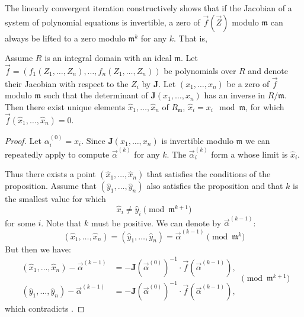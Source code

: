 The linearly convergent iteration constructively shows that if the
Jacobian of a system of polynomial equations is invertible, a zero of
$\vec{f}(\vec{Z})$ modulo $\mathfrak{m}$ can always be lifted to a zero
modulo $\mathfrak{m}^k$ for any $k$.  That is,

\begin{proposition}\label{MNewton:Iter:Prop}
Assume $R$ is an integral domain with an ideal $\mathfrak{m}$.  Let
$\vec{f} = (f_1(Z_1, \ldots, Z_n), \ldots, f_n(Z_1, \ldots, Z_n))$ be
polynomials over $R$ and denote their Jacobian with respect to the
$Z_i$ by $\mathbf{J}$.  Let $(x_1, \ldots, x_n)$ be a zero of $\vec{f}$
modulo $\mathfrak{m}$ such that the determinant of $\mathbf{J}(x_1, \ldots,
x_n)$ has an inverse in $R/\mathfrak{m}$.  Then there exist unique
elements $\hat{x}_1, \ldots, \hat{x}_n$ of $R_\mathfrak{m}$, $\hat{x}_i =
x_i \mod\mathfrak{m}$, for which $\vec{f}(\hat{x}_1, \ldots, \hat{x}_n)
= 0$.
\end{proposition}

\begin{proof}
Let $\alpha_i^{(0)} = x_i$.  Since $\mathbf{J}(x_1, \ldots, x_n)$ is
invertible modulo $\mathfrak{m}$ we can repeatedly apply
 to compute $\vec{\alpha}^{(k)}$ for any
$k$.  The $\vec{\alpha}_i^{(k)}$ form a  whose
limit is $\hat{x}_i$.

Thus there exists a point $(\hat{x}_1, \ldots, \hat{x}_n)$ that
satisfies the conditions of the proposition.  Assume that $(\hat{y}_1, 
\ldots, \hat{y}_n)$ also satisfies the proposition and that $k$ is the 
smallest value for which 
\begin{equation} \label{MNewton:NotEq:Eq}
\hat{x}_i \not= \hat{y}_i \pmod{\mathfrak{m}^{k+1}}
\end{equation}
for some $i$. Note that $k$ must be positive. We can denote by
$\vec{\alpha}^{(k-1)}$:
\[
(\hat{x}_1, \ldots, \hat{x}_n) = (\hat{y}_1, \ldots, \hat{y}_n) =
\vec{\alpha}^{(k-1)} \pmod{\mathfrak{m}^k}
\]
But then we have:
\[
\begin{aligned}
(\hat{x}_1, \ldots, \hat{x}_n) - \vec{\alpha}^{(k-1)}
   &= -\mathbf{J}(\vec{\alpha}^{(0)})^{-1} 
  \cdot \vec{f}(\vec{\alpha}^{(k-1)}), \\
(\hat{y}_1, \ldots, \hat{y}_n) - \vec{\alpha}^{(k-1)}
   &= -\mathbf{J}(\vec{\alpha}^{(0)})^{-1} 
  \cdot \vec{f}(\vec{\alpha}^{(k-1)}),
\end{aligned}
\pmod{\mathfrak{m}^{k+1}}
\]
which contradicts .
\end{proof}

